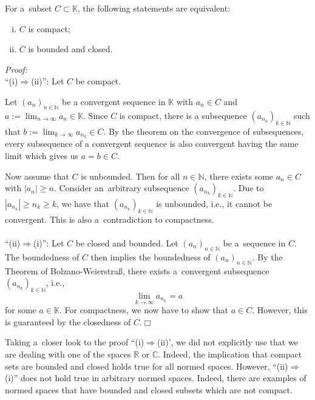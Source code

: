 

\begin{Theorem}
For a~subset $C\subset\mathbb{K}$, the following statements are equivalent:
\begin{enumerate}[(i)]
 \item $C$ is compact;
 \item $C$ is bounded and closed.
\end{enumerate}
\end{Theorem}
{\em Proof:} \\
``(i)$\Rightarrow$(ii)'': Let $C$ be compact. 

Let $(a_n)_{n\in\mathbb{N}}$ be a convergent sequence in $\mathbb{K}$ with $a_n\in C$ and $a:=\lim_{n\rightarrow\infty} a_n \in\mathbb{K}$. 
Since $C$ is compact, there is a subsequence $(a_{n_k})_{k\in\mathbb{N}}$ such that $b:=\lim_{k\rightarrow\infty} a_{n_k}\in C$.
By the theorem on the convergence of subsequences, every subsequence of a convergent sequence is also convergent having the same limit which gives us $a=b\in C$.

Now assume that $C$ is unbounded. Then for all $n\in\mathbb{N}$, there exists some $a_n\in C$ with $|a_n|\geq n$. Consider an~arbitrary subsequence $(a_{n_k})_{k\in\mathbb{N}}$. Due to $|a_{n_k}|\geq n_k\geq k$, we have that $(a_{n_k})_{k\in\mathbb{N}}$ is unbounded, i.e., it cannot be convergent. This is also a~contradiction to compactness.\\
~\\
``(ii)$\Rightarrow$(i)'':
Let $C$ be closed and bounded. Let  $(a_n)_{n\in\mathbb{N}}$ be a~sequence in $C$. The boundedness of $C$ then implies the boundedness of $(a_n)_{n\in\mathbb{N}}$. By the Theorem of Bolzano-Weierstra\ss, there exists a~convergent subsequence  $(a_{n_k})_{k\in\mathbb{N}}$, i.e.,
\[\lim_{k\to\infty}a_{n_k}=a\]
for some $a\in\mathbb{K}$. For compactness, we now have to show that $a\in C$. However, this is guaranteed by the closedness of $C$.\hfill$\Box$
\begin{Remark}{}
    Taking a~closer look to the proof ``(i)$\Rightarrow$(ii)', we did not explicitly use that we are dealing with one of the spaces $\mathbb{R}$ or $\mathbb{C}$. Indeed, the implication that compact sets are bounded and closed holds true for all normed spaces. However, ``(ii)$\Rightarrow$(i)'' does not hold true in arbitrary normed spaces. Indeed, there are examples of normed spaces that have bounded and closed subsets which are not compact.
\end{Remark}
